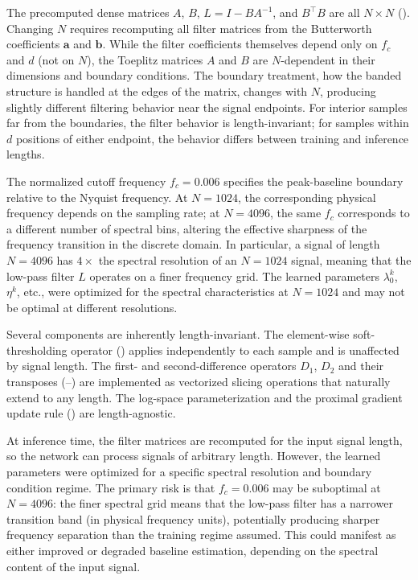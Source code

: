 The precomputed dense matrices $A$, $B$, $L = I - BA^{-1}$, and $B^\top B$ are all $N \times N$ (). Changing $N$ requires recomputing all filter matrices from the Butterworth coefficients $\mathbf{a}$ and $\mathbf{b}$. While the filter coefficients themselves depend only on $f_c$ and $d$ (not on $N$), the Toeplitz matrices $A$ and $B$ are $N$-dependent in their dimensions and boundary conditions. The boundary treatment, how the banded structure is handled at the edges of the matrix, changes with $N$, producing slightly different filtering behavior near the signal endpoints. For interior samples far from the boundaries, the filter behavior is length-invariant; for samples within $d$ positions of either endpoint, the behavior differs between training and inference lengths.

The normalized cutoff frequency $f_c = 0.006$ specifies the peak-baseline boundary relative to the Nyquist frequency. At $N = 1024$, the corresponding physical frequency depends on the sampling rate; at $N = 4096$, the same $f_c$ corresponds to a different number of spectral bins, altering the effective sharpness of the frequency transition in the discrete domain. In particular, a signal of length $N = 4096$ has $4\times$ the spectral resolution of an $N = 1024$ signal, meaning that the low-pass filter $L$ operates on a finer frequency grid. The learned parameters $\lambda_0^k$, $\eta^k$, etc., were optimized for the spectral characteristics at $N = 1024$ and may not be optimal at different resolutions.

Several components are inherently length-invariant. The element-wise soft-thresholding operator () applies independently to each sample and is unaffected by signal length. The first- and second-difference operators $D_1$, $D_2$ and their transposes (--) are implemented as vectorized slicing operations that naturally extend to any length. The log-space parameterization and the proximal gradient update rule () are length-agnostic.

At inference time, the filter matrices are recomputed for the input signal length, so the network can process signals of arbitrary length. However, the learned parameters were optimized for a specific spectral resolution and boundary condition regime. The primary risk is that $f_c = 0.006$ may be suboptimal at $N = 4096$: the finer spectral grid means that the low-pass filter has a narrower transition band (in physical frequency units), potentially producing sharper frequency separation than the training regime assumed. This could manifest as either improved or degraded baseline estimation, depending on the spectral content of the input signal.

